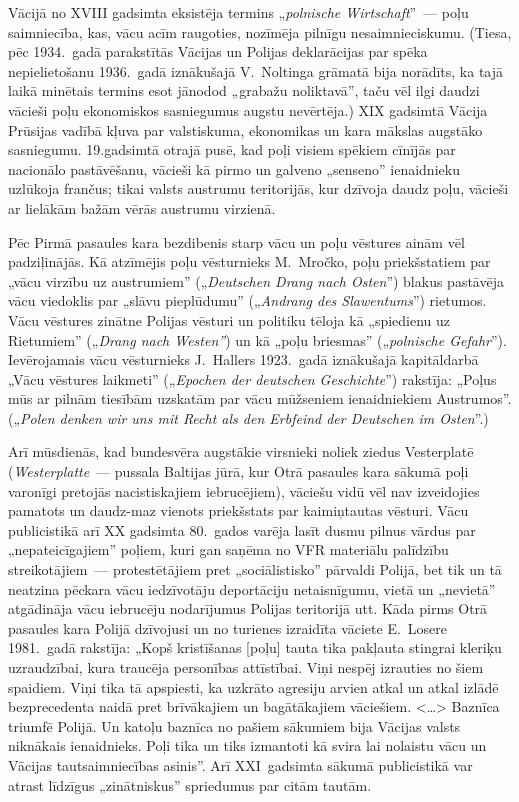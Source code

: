 \documentclass[twoside,a5paper,12pt,fleqn,openany]{extbook}
\newcommand{\detxti}[1]{\textit{\textgerman{#1}}}
\newcommand{\citespace}{<\dots{}>}
\begin{document}
Vācijā no XVIII gadsimta eksistēja termins „\detxti{polnische Wirtschaft}”~--- poļu saimniecība, kas, vācu acīm raugoties, nozīmēja pilnīgu nesaimnieciskumu. (Tiesa, pēc 1934.~gadā parakstītās Vācijas un Polijas deklarācijas par spēka nepielietošanu 1936.~gadā iznākušajā V.~Noltinga grāmatā bija norādīts, ka tajā laikā minētais termins esot jānodod „grabažu noliktavā”, taču vēl ilgi daudzi vācieši poļu ekonomiskos sasniegumus augstu nevērtēja.) XIX gadsimtā Vācija Prūsijas vadībā kļuva par valstiskuma, ekonomikas un kara mākslas augstāko sasniegumu. 19.gadsimtā otrajā pusē, kad poļi visiem spēkiem cīnījās par nacionālo pastāvēšanu, vācieši kā pirmo un galveno „senseno” ienaidnieku uzlūkoja frančus; tikai valsts austrumu teritorijās, kur dzīvoja daudz poļu, vācieši ar lielākām bažām vērās austrumu virzienā.

Pēc Pirmā pasaules kara bezdibenis starp vācu un poļu vēstures ainām vēl padziļinājās. Kā atzīmējis poļu vēsturnieks M.~Mročko, poļu priekšstatiem par „vācu virzību uz austrumiem” („\detxti{Deutschen Drang nach Osten}”) blakus pastāvēja vācu viedoklis par „slāvu pieplūdumu” („\detxti{Andrang des Slawentums}”) rietumos. Vācu vēstures zinātne Polijas vēsturi un politiku tēloja kā „spiedienu uz Rietumiem” („\detxti{Drang nach Westen”}) un kā „poļu briesmas” („\detxti{polnische Gefahr}”). Ievērojamais vācu vēsturnieks J.~Hallers 1923.~gadā iznākušajā kapitāldarbā „Vācu vēstures laikmeti'' („\detxti{Epochen der deutschen Geschichte}'') rakstīja: „Poļus mūs ar pilnām tiesībām uzskatām par vācu mūžseniem ienaidniekiem Austrumos''. („\detxti{Polen denken wir uns mit Recht als den Erbfeind der Deutschen im Osten}”.)

Arī mūsdienās, kad bundesvēra augstākie virsnieki noliek ziedus Vesterplatē (\detxti{Westerplatte}~--- pussala Baltijas jūrā, kur Otrā pasaules kara sākumā poļi varonīgi pretojās nacistiskajiem iebrucējiem), vāciešu vidū vēl nav izveidojies pamatots un daudz-maz vienots priekšstats par kaimiņtautas vēsturi. Vācu publicistikā arī XX gadsimta 80.~gados varēja lasīt dusmu pilnus vārdus par „nepateicīgajiem” poļiem, kuri gan saņēma no VFR materiālu palīdzību streikotājiem~--- protestētājiem pret „sociālistisko” pārvaldi Polijā, bet tik un tā neatzina pēckara vācu iedzīvotāju deportāciju netaisnīgumu, vietā un „nevietā” atgādināja vācu iebrucēju nodarījumus Polijas teritorijā utt. Kāda pirms Otrā pasaules kara Polijā dzīvojusi un no turienes izraidīta vāciete E.~Losere 1981.~gadā rakstīja: „Kopš kristīšanas [poļu] tauta tika pakļauta stingrai kleriķu uzraudzībai, kura traucēja personības attīstībai. Viņi nespēj izrauties no šiem spaidiem. Viņi tika tā apspiesti, ka uzkrāto agresiju arvien atkal un atkal izlādē bezprecedenta naidā pret brīvākajiem un bagātākajiem vāciešiem. \citespace{} Baznīca triumfē Polijā. Un katoļu baznīca no pašiem sākumiem bija Vācijas valsts niknākais ienaidnieks. Poļi tika un tiks izmantoti kā svira lai nolaistu vācu un Vācijas tautsaimniecības asinis”. Arī XXI~gadsimta sākumā publicistikā var atrast līdzīgus „zinātniskus'' spriedumus par citām tautām.
\end{document}
